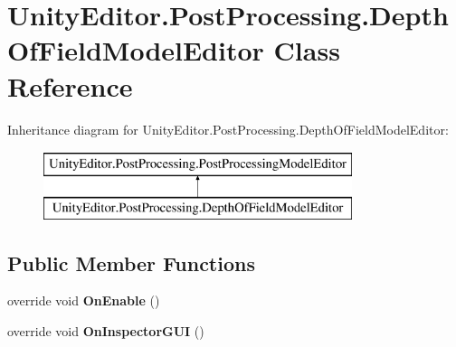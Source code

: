 \hypertarget{class_unity_editor_1_1_post_processing_1_1_depth_of_field_model_editor}{}\section{Unity\+Editor.\+Post\+Processing.\+Depth\+Of\+Field\+Model\+Editor Class Reference}
\label{class_unity_editor_1_1_post_processing_1_1_depth_of_field_model_editor}
Inheritance diagram for Unity\+Editor.\+Post\+Processing.\+Depth\+Of\+Field\+Model\+Editor\+:\begin{figure}[H]
\begin{center}
\leavevmode
\includegraphics[height=2.000000cm]{class_unity_editor_1_1_post_processing_1_1_depth_of_field_model_editor}
\end{center}
\end{figure}
\subsection*{Public Member Functions}
\begin{DoxyCompactItemize}
\item 
\mbox{\label{class_unity_editor_1_1_post_processing_1_1_depth_of_field_model_editor_a734cf645dac2b322e98d85ad7652dd2a}} 
override void {\bfseries On\+Enable} ()
\item 
\mbox{\label{class_unity_editor_1_1_post_processing_1_1_depth_of_field_model_editor_a16d6393fb53a11e086f8caac90166b25}} 
override void {\bfseries On\+Inspector\+G\+UI} ()
\end{DoxyCompactItemize}

